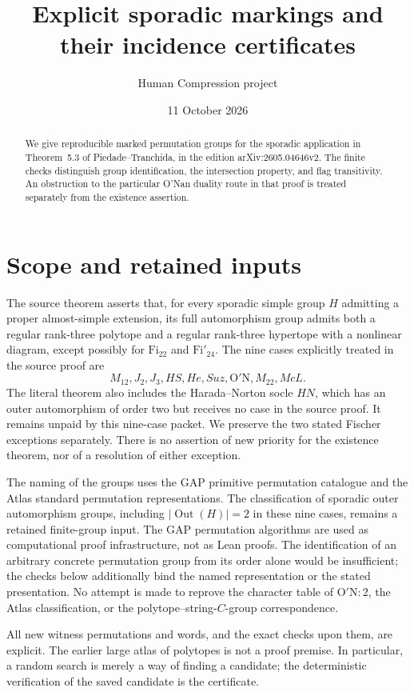 \documentclass[11pt]{article}
\title{Explicit sporadic markings and their incidence certificates}
\author{Human Compression project}
\date{11 October 2026}
\newcommand{\ON}{\mathrm{O'N}}
\begin{document}
\maketitle
\begin{abstract}
We give reproducible marked permutation groups for the sporadic application in Theorem~5.3 of Piedade--Tranchida, in the edition arXiv:2605.04646v2. The finite checks distinguish group identification, the intersection property, and flag transitivity. An obstruction to the particular O'Nan duality route in that proof is treated separately from the existence assertion.
\end{abstract}
\section{Scope and retained inputs}
The source theorem asserts that, for every sporadic simple group $H$ admitting a proper almost-simple extension, its full automorphism group admits both a regular rank-three polytope and a regular rank-three hypertope with a nonlinear diagram, except possibly for $\mathrm{Fi}_{22}$ and $\mathrm{Fi}'_{24}$. The nine cases explicitly treated in the source proof are
\[
M_{12},J_2,J_3,HS,He,Suz,\ON,M_{22},McL.
\]
The literal theorem also includes the Harada--Norton socle $HN$, which has an outer automorphism of order two but receives no case in the source proof. It remains unpaid by this nine-case packet. We preserve the two stated Fischer exceptions separately. There is no assertion of new priority for the existence theorem, nor of a resolution of either exception.

The naming of the groups uses the GAP primitive permutation catalogue and the Atlas standard permutation representations. The classification of sporadic outer automorphism groups, including $|\operatorname{Out}(H)|=2$ in these nine cases, remains a retained finite-group input. The GAP permutation algorithms are used as computational proof infrastructure, not as Lean proofs. The identification of an arbitrary concrete permutation group from its order alone would be insufficient; the checks below additionally bind the named representation or the stated presentation. No attempt is made to reprove the character table of $\ON:2$, the Atlas classification, or the polytope--string-$C$-group correspondence.

All new witness permutations and words, and the exact checks upon them, are explicit. The earlier large atlas of polytopes is not a proof premise. In particular, a random search is merely a way of finding a candidate; the deterministic verification of the saved candidate is the certificate.
\end{document}
